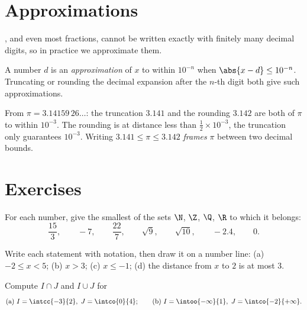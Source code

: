 \section{Approximations}

, and even most fractions, cannot be written exactly
with finitely many decimal digits, so in practice we approximate them.

\begin{definition}\label{def:g10:numbers:approx}
A number $d$ is an \emph{approximation} of $x$ to
within $10^{-n}$ when $\abs{x - d} \leq 10^{-n}$. Truncating or rounding
the decimal expansion after the $n$-th digit both give such
approximations.
\end{definition}

\begin{example}
From $\pi = 3.14159\,26\dots$: the truncation $3.141$ and the rounding
$3.142$ are both  of $\pi$ to within $10^{-3}$. The rounding
is at distance less than $\frac12 \times 10^{-3}$, the truncation only
guarantees $10^{-3}$. Writing $3.141 \leq \pi \leq 3.142$ \emph{frames}
$\pi$ between two decimal bounds.
\end{example}

\section{Exercises}

\begin{exercise}[$\star$]\label{exo:g10:numbers:1}
For each number, give the smallest of the sets $\N$, $\Z$, $\Q$, $\R$ to
which it belongs:
\[
\frac{15}{3}, \qquad -7, \qquad \frac{22}{7}, \qquad \sqrt{9}, \qquad
\sqrt{10}, \qquad -2.4, \qquad 0 .
\]
\end{exercise}

\begin{exercise}[$\star$]\label{exo:g10:numbers:2}
Write each statement with  notation, then draw it on a number
line: (a) $-2 \leq x < 5$; (b) $x > 3$; (c) $x \leq -1$;
(d) the distance from $x$ to $2$ is at most $3$.
\end{exercise}

\begin{exercise}[$\star$]\label{exo:g10:numbers:3}
Compute $I \cap J$ and $I \cup J$ for
\[
\text{(a) } I = \intcc{-3}{2},\ J = \intco{0}{4};
\qquad
\text{(b) } I = \intoo{-\infty}{1},\ J = \intco{-2}{+\infty}.
\]
\end{exercise}

